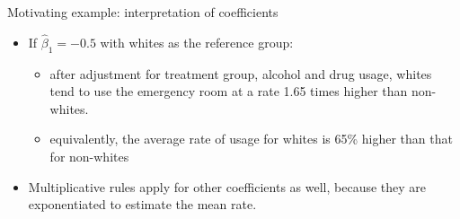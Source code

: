 \documentclass[ignorenonframetext,]{beamer}
\providecommand{\tightlist}{%
  \setlength{\itemsep}{0pt}\setlength{\parskip}{0pt}}
\begin{document}
\begin{frame}{Motivating example: interpretation of coefficients}

\begin{itemize}
\tightlist
\item
  If \(\hat \beta_1=-0.5\) with whites as the reference group:

  \begin{itemize}
  \tightlist
  \item
    after adjustment for treatment group, alcohol and drug usage, whites
    tend to use the emergency room at a rate 1.65 times higher than
    non-whites.
  \item
    equivalently, the average rate of usage for whites is 65\% higher
    than that for non-whites
  \end{itemize}
\item
  Multiplicative rules apply for other coefficients as well, because
  they are exponentiated to estimate the mean rate.
\end{itemize}

\end{frame}
\end{document}
